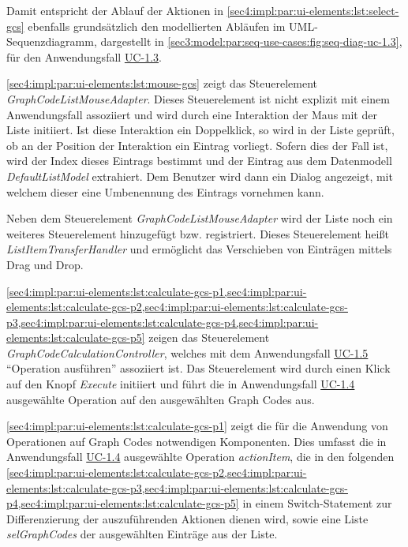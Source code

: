 Damit entspricht der Ablauf der Aktionen in \cref{sec4:impl:par:ui-elements:lst:select-gcs} ebenfalls grundsätzlich den modellierten Abläufen im UML-Sequenzdiagramm, dargestellt in \cref{sec3:model:par:seq-use-cases:fig:seq-diag-uc-1.3}, für den Anwendungsfall \hyperref[sec3:model:uc-1.3]{UC-1.3}.

\cref{sec4:impl:par:ui-elements:lst:mouse-gcs} zeigt das Steuerelement \textit{GraphCodeListMouseAdapter}.
Dieses Steuerelement ist nicht explizit mit einem Anwendungsfall assoziiert und wird durch eine Interaktion der Maus mit der Liste initiiert.
Ist diese Interaktion ein Doppelklick, so wird in der Liste geprüft, ob an der Position der Interaktion ein Eintrag vorliegt.
Sofern dies der Fall ist, wird der Index dieses Eintrags bestimmt und der Eintrag aus dem Datenmodell \textit{DefaultListModel} extrahiert.
Dem Benutzer wird dann ein Dialog angezeigt, mit welchem dieser eine Umbenennung des Eintrags vornehmen kann.



Neben dem Steuerelement \textit{GraphCodeListMouseAdapter} wird der Liste noch ein weiteres Steuerelement hinzugefügt bzw. registriert.
Dieses Steuerelement heißt \textit{ListItemTransferHandler} und ermöglicht das Verschieben von Einträgen mittels Drag und Drop.

\cref{sec4:impl:par:ui-elements:lst:calculate-gcs-p1,sec4:impl:par:ui-elements:lst:calculate-gcs-p2,sec4:impl:par:ui-elements:lst:calculate-gcs-p3,sec4:impl:par:ui-elements:lst:calculate-gcs-p4,sec4:impl:par:ui-elements:lst:calculate-gcs-p5} zeigen das Steuerelement \textit{GraphCodeCalculationController}, welches mit dem Anwendungsfall \hyperref[sec3:model:uc-1.5]{UC-1.5} \enquote{Operation ausführen} assoziiert ist.
Das Steuerelement wird durch einen Klick auf den Knopf \textit{Execute} initiiert und führt die in Anwendungsfall \hyperref[sec3:model:uc-1.4]{UC-1.4} ausgewählte Operation auf den ausgewählten Graph Codes aus.

\cref{sec4:impl:par:ui-elements:lst:calculate-gcs-p1} zeigt die für die Anwendung von Operationen auf Graph Codes notwendigen Komponenten.
Dies umfasst die in Anwendungsfall \hyperref[sec3:model:uc-1.4]{UC-1.4} ausgewählte Operation \textit{actionItem}, die in den folgenden \cref{sec4:impl:par:ui-elements:lst:calculate-gcs-p2,sec4:impl:par:ui-elements:lst:calculate-gcs-p3,sec4:impl:par:ui-elements:lst:calculate-gcs-p4,sec4:impl:par:ui-elements:lst:calculate-gcs-p5} in einem Switch-Statement zur Differenzierung der auszuführenden Aktionen dienen wird, sowie eine Liste \textit{selGraphCodes} der ausgewählten Einträge aus der Liste.

